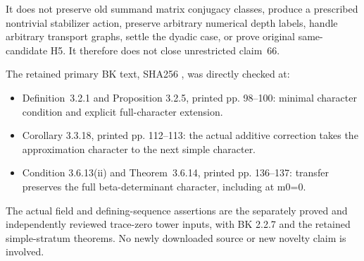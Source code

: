 It does not preserve old summand matrix conjugacy classes, produce a
prescribed nontrivial stabilizer action, preserve arbitrary numerical
depth labels, handle arbitrary transport graphs, settle the dyadic case,
or prove original same-candidate H5. It therefore does not close
unrestricted claim~66.

The retained primary BK text, SHA256
,
was directly checked at:

\begin{itemize}
\tightlist
\item
  Definition~3.2.1 and Proposition 3.2.5, printed pp. 98--100: minimal
  character condition and explicit full-character extension.
\item
  Corollary 3.3.18, printed pp. 112--113: the actual additive correction takes
  the approximation character to the next simple character.
\item
  Condition 3.6.13(ii) and Theorem~3.6.14, printed pp. 136--137: transfer
  preserves the full beta-determinant character, including at m0=0.
\end{itemize}

The actual field and defining-sequence assertions are the separately
proved and independently reviewed trace-zero tower inputs, with BK 2.2.7
and the retained simple-stratum theorems. No newly downloaded source or
new novelty claim is involved.
